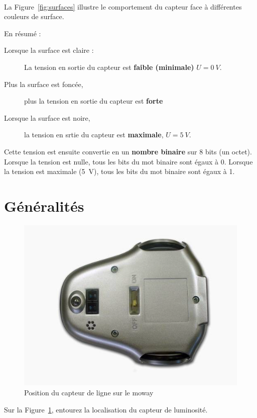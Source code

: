 \documentclass[10pt,fleqn]{article} %
\begin{document}
\paragraph{}
La Figure~\ref{fig:surfaces} illustre le comportement du capteur face à différentes couleurs de surface. 

En résumé : 

\begin{description}
\item[Lorsque la surface est claire : ] La tension en sortie du capteur est \textbf{faible (minimale)} $ U = \SI{0}{V}$.
\item[Plus la surface est foncée, ] plus la tension en sortie du capteur est \textbf{forte}
\item[Lorsque la surface est noire, ] la tension en srtie du capteur est \textbf{maximale}, $U = \SI{5}{V}$. 
\end{description}

Cette tension est ensuite convertie en un \textbf{nombre binaire} sur 8 bits (un octet). Lorsque la tension est nulle, tous les bits du mot binaire sont égaux à 0. Lorsque la tension est maximale (\SI{5}{V}), tous les bits du mot binaire sont égaux à 1. 
\pagebreak
\section{Généralités}
\begin{figure}[h]
    \centering
    \includegraphics[width=.4\textwidth]{images/CapteurDeLigne-ConvertImage.png}
    \caption{Position du capteur de ligne sur le moway}
    \label{fig:moway}
\end{figure}

\begin{exercise}
    \begin{question}
        Sur la Figure~\ref{fig:moway}, entourez la localisation du capteur de luminosité. 
    \end{question}
\end{exercise}
\end{document}
